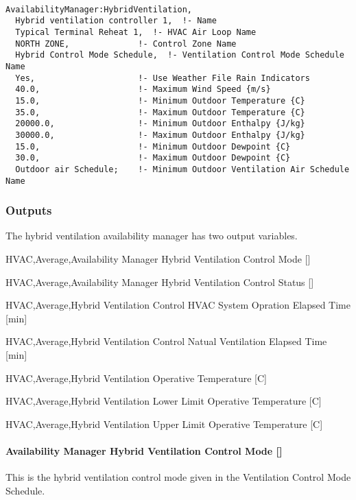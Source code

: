 \begin{lstlisting}

AvailabilityManager:HybridVentilation,
  Hybrid ventilation controller 1,  !- Name
  Typical Terminal Reheat 1,  !- HVAC Air Loop Name
  NORTH ZONE,              !- Control Zone Name
  Hybrid Control Mode Schedule,  !- Ventilation Control Mode Schedule Name
  Yes,                     !- Use Weather File Rain Indicators
  40.0,                    !- Maximum Wind Speed {m/s}
  15.0,                    !- Minimum Outdoor Temperature {C}
  35.0,                    !- Maximum Outdoor Temperature {C}
  20000.0,                 !- Minimum Outdoor Enthalpy {J/kg}
  30000.0,                 !- Maximum Outdoor Enthalpy {J/kg}
  15.0,                    !- Minimum Outdoor Dewpoint {C}
  30.0,                    !- Maximum Outdoor Dewpoint {C}
  Outdoor air Schedule;    !- Minimum Outdoor Ventilation Air Schedule Name
\end{lstlisting}

\subsubsection{Outputs}\label{outputs-9-008}

The hybrid ventilation availability manager has two output variables.

HVAC,Average,Availability Manager Hybrid Ventilation Control Mode {[]}

HVAC,Average,Availability Manager Hybrid Ventilation Control Status {[]}

HVAC,Average,Hybrid Ventilation Control HVAC System Opration Elapsed Time {[min]}

HVAC,Average,Hybrid Ventilation Control Natual Ventilation Elapsed Time {[min]}

HVAC,Average,Hybrid Ventilation Operative Temperature {[C]}

HVAC,Average,Hybrid Ventilation Lower Limit Operative Temperature {[C]}

HVAC,Average,Hybrid Ventilation Upper Limit Operative Temperature {[C]}

\paragraph{Availability Manager Hybrid Ventilation Control Mode {[]}}\label{availability-manager-hybrid-ventilation-control-mode}

This is the hybrid ventilation control mode given in the Ventilation Control Mode Schedule.

